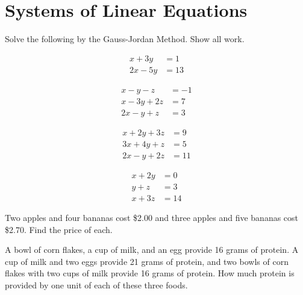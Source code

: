 \section{Systems of Linear Equations}

Solve the following by the Gauss-Jordan Method. Show all work.

\begin{puzzle}
    \begin{align*}
        x + 3y  & = 1  \\
        2x - 5y & = 13
    \end{align*}
\end{puzzle}

\begin{puzzle}
    \begin{align*}
        x - y - z   & = -1 \\
        x - 3y + 2z & = 7  \\
        2x - y + z  & = 3
    \end{align*}
\end{puzzle}

\begin{puzzle}
    \begin{align*}
        x + 2y + 3z & = 9  \\
        3x + 4y + z & = 5  \\
        2x - y + 2z & = 11
    \end{align*}
\end{puzzle}

\begin{puzzle}
    \begin{align*}
        x + 2y & = 0  \\
        y + z  & = 3  \\
        x + 3z & = 14
    \end{align*}
\end{puzzle}

\begin{puzzle}
    Two apples and four bananas cost \$2.00 and three apples and five bananas cost \$2.70. Find the price of each.
\end{puzzle}

\begin{puzzle}
    A bowl of corn flakes, a cup of milk, and an egg provide 16 grams of protein. A cup of milk and two eggs provide 21 grams of protein, and two bowls of corn flakes with two cups of milk provide 16 grams of protein. How much protein is provided by one unit of each of these three foods.
\end{puzzle}

